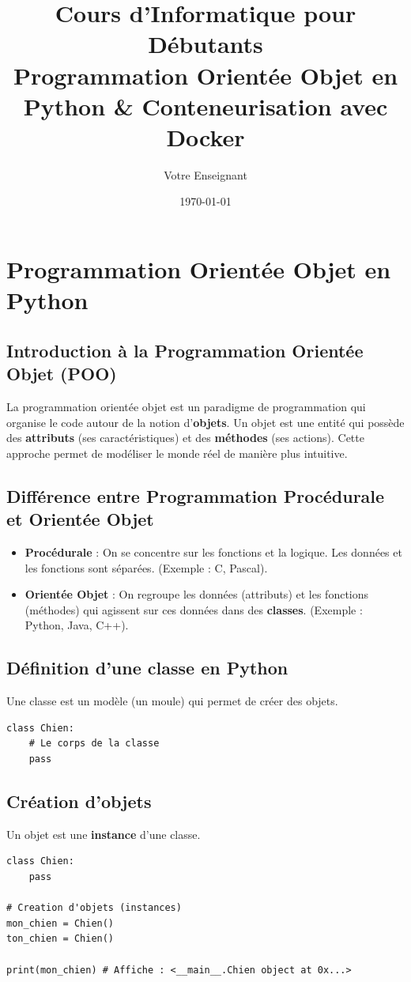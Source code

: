 \documentclass[a4paper,12pt]{article}
\title{\textbf{Cours d'Informatique pour Débutants} \\
\large Programmation Orientée Objet en Python \& Conteneurisation avec Docker}
\author{Votre Enseignant}
\date{\today}
\begin{document}
\maketitle
\tableofcontents
\newpage

\section{Programmation Orientée Objet en Python}

\subsection{Introduction à la Programmation Orientée Objet (POO)}
La programmation orientée objet est un paradigme de programmation qui organise le code autour de la notion d'\textbf{objets}. Un objet est une entité qui possède des \textbf{attributs} (ses caractéristiques) et des \textbf{méthodes} (ses actions). Cette approche permet de modéliser le monde réel de manière plus intuitive.

\subsection{Différence entre Programmation Procédurale et Orientée Objet}
\begin{itemize}
    \item \textbf{Procédurale} : On se concentre sur les fonctions et la logique. Les données et les fonctions sont séparées. (Exemple : C, Pascal).
    \item \textbf{Orientée Objet} : On regroupe les données (attributs) et les fonctions (méthodes) qui agissent sur ces données dans des \textbf{classes}. (Exemple : Python, Java, C++).
\end{itemize}

\subsection{Définition d'une classe en Python}
Une classe est un modèle (un moule) qui permet de créer des objets.
\begin{lstlisting}
class Chien:
    # Le corps de la classe
    pass
\end{lstlisting}

\subsection{Création d'objets}
Un objet est une \textbf{instance} d'une classe.
\begin{lstlisting}
class Chien:
    pass

# Creation d'objets (instances)
mon_chien = Chien()
ton_chien = Chien()

print(mon_chien) # Affiche : <__main__.Chien object at 0x...>
\end{lstlisting}
\end{document}
